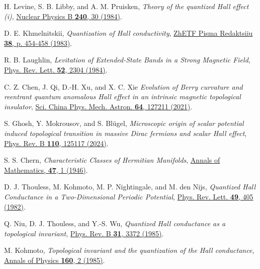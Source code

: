 \documentclass[aps,prl,amsmath,amssymb,twocolumn, superscriptaddress]{revtex4-2}
\begin{document}
\begin{thebibliography}{10}
H. Levine, S. B. Libby, and A. M. Pruisken, {\em Theory of
the quantized Hall effect (i)}, \href{https://www.sciencedirect.com/science/article/pii/0550321384902773}{Nuclear Physics B {\bfseries 240}, 30 (1984)}.

D. E. Khmelnitskii, {\em  Quantization of Hall conductivity}, \href{https://ui.adsabs.harvard.edu/abs/1983ZhPmR..38..454K/abstract}{ZhETF Pisma Redaktsiiu {\bfseries 38}, p. 454-458 (1983)}.

R. B. Laughlin, {\em Levitation of Extended-State Bands in a Strong Magnetic Field}, \href{https://journals.aps.org/prl/abstract/10.1103/PhysRevLett.52.2304}{Phys. Rev. Lett. {\bfseries 52}, 2304 (1984)}.

C. Z. Chen, J. Qi, D.-H. Xu, and X. C. Xie {\em Evolution of Berry curvature and reentrant quantum anomalous Hall effect in an intrinsic magnetic topological insulator}, \href{https://link.springer.com/article/10.1007/s11433-021-1774-1}{Sci. China Phys. Mech. Astron. {\bfseries 64}, 127211 (2021)}.

S. Ghosh, Y. Mokrousov, and S. Blügel, {\em Microscopic origin of scalar potential induced topological transition in massive Dirac fermions and scalar Hall effect}, 
\href{https://journals.aps.org/prb/abstract/10.1103/PhysRevB.110.125117}{Phys. Rev. B {\bfseries{110}}, 125117 (2024)}.

S. S. Chern, {\em Characteristic Classes of Hermitian Manifolds}, 
\href{https://www.jstor.org/stable/1969037?seq=1}{Annals of Mathematics, {\bfseries 47}, 1 (1946)}.

D. J. Thouless, M. Kohmoto, M. P. Nightingale, and M. den Nijs, {\em Quantized Hall Conductance in a Two-Dimensional Periodic Potential}, 
\href{https://journals.aps.org/prl/abstract/10.1103/PhysRevLett.49.405}{Phys. Rev. Lett. {\bfseries{49}}, 405 (1982)}.

Q. Niu, D. J. Thouless, and Y.-S. Wu, {\em Quantized Hall conductance as a topological invariant}, 
\href{https://journals.aps.org/prb/abstract/10.1103/PhysRevB.31.3372}{Phys. Rev. B {\bfseries{31}}, 3372 (1985)}.

M. Kohmoto, {\em Topological invariant and the quantization of the Hall conductance}, \href{https://www.sciencedirect.com/science/article/pii/0003491685901484}{Annals of Physics {\bfseries 160}, 2 (1985)}.


\end{thebibliography}
\end{document}
